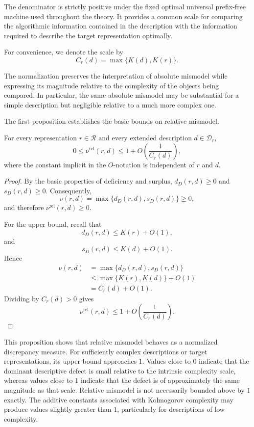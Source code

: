 The denominator is strictly positive under the fixed optimal universal prefix-free machine used throughout the theory. It provides a common scale for comparing the algorithmic information contained in the description with the information required to describe the target representation optimally.

\begin{notation}
For convenience, we denote the scale by
\[
C_r(d) = \max\{K(d),K(r)\}.
\]
\end{notation}

The normalization preserves the interpretation of absolute mismodel while expressing its magnitude relative to the complexity of the objects being compared. In particular, the same absolute mismodel may be substantial for a simple description but negligible relative to a much more complex one.

The first proposition establishes the basic bounds on relative mismodel.

\begin{proposition}
\label{prop:range_rel_mismodel}
For every representation $r\in\mathcal R$ and every extended description $d\in\mathcal D_r$,
\[
0 \le \nu^{\mathrm{rel}}(r,d) \le 1+O\left(\frac{1}{C_r(d)}\right),
\]
where the constant implicit in the $O$-notation is independent of $r$ and $d$.
\end{proposition}
\begin{proof}
By the basic properties of deficiency and surplus, $d_D(r,d) \ge 0$ and $s_D(r,d) \ge 0$. Consequently,
\[
\nu(r,d)=\max\{d_D(r,d),s_D(r,d)\} \ge 0,
\]
and therefore $\nu^{\mathrm{rel}}(r,d)\ge 0$.

For the upper bound, recall that
\[
d_D(r,d)\le K(r)+O(1),
\]
and
\[
s_D(r,d)\le K(d)+O(1).
\]
Hence
\[
\begin{aligned}
\nu(r,d)
& = \max\{d_D(r,d),s_D(r,d)\}\\
& \le \max\{K(r),K(d)\}+O(1)\\
& = C_r(d)+O(1).
\end{aligned}
\]
Dividing by $C_r(d)>0$ gives
\[
\nu^{\mathrm{rel}}(r,d) \le 1+O\left(\frac{1}{C_r(d)}\right).
\]
\end{proof}

This proposition shows that relative mismodel behaves as a normalized discrepancy measure. For sufficiently complex descriptions or target representations, its upper bound approaches $1$. Values close to $0$ indicate that the dominant descriptive defect is small relative to the intrinsic complexity scale, whereas values close to $1$ indicate that the defect is of approximately the same magnitude as that scale. Relative mismodel is not necessarily bounded above by $1$ exactly. The additive constants associated with Kolmogorov complexity may produce values slightly greater than $1$, particularly for descriptions of low complexity.

